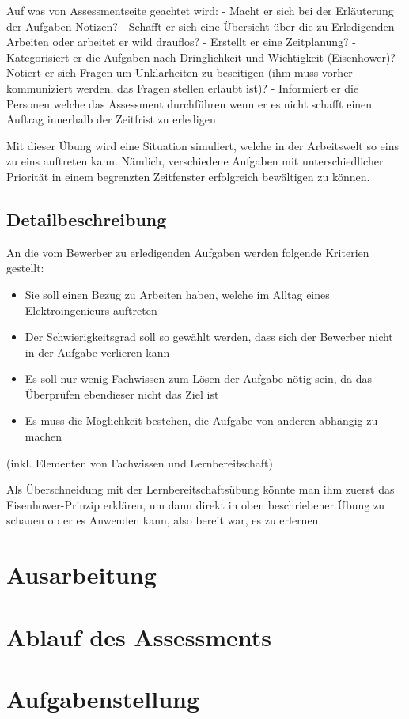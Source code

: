 Auf was von Assessmentseite geachtet wird:
- Macht er sich bei der Erläuterung der Aufgaben Notizen?
- Schafft er sich eine Übersicht über die zu Erledigenden Arbeiten oder arbeitet er wild drauflos?
- Erstellt er eine Zeitplanung?
- Kategorisiert er die Aufgaben nach Dringlichkeit und Wichtigkeit (Eisenhower)?
- Notiert er sich Fragen um Unklarheiten zu beseitigen (ihm muss vorher kommuniziert werden, das Fragen stellen erlaubt ist)?
- Informiert er die Personen welche das Assessment durchführen wenn er es nicht schafft einen Auftrag innerhalb der Zeitfrist zu erledigen

Mit dieser Übung wird eine Situation simuliert, welche in der Arbeitswelt so eins zu eins auftreten kann. Nämlich, verschiedene Aufgaben mit unterschiedlicher Priorität in einem begrenzten Zeitfenster erfolgreich bewältigen zu können.

\subsection{Detailbeschreibung}

An die vom Bewerber zu erledigenden Aufgaben werden folgende Kriterien gestellt:

\begin{itemize}
\item Sie soll einen Bezug zu Arbeiten haben, welche im Alltag eines Elektroingenieurs auftreten
\item Der Schwierigkeitsgrad soll so gewählt werden, dass sich der Bewerber nicht in der Aufgabe verlieren kann \item Es soll nur wenig Fachwissen zum Lösen der Aufgabe nötig sein, da das Überprüfen ebendieser nicht das Ziel ist
\item Es muss die Möglichkeit bestehen, die Aufgabe von anderen abhängig zu machen
\end{itemize}

(inkl. Elementen von Fachwissen und Lernbereitschaft)

Als Überschneidung mit der Lernbereitschaftsübung könnte man ihm zuerst das Eisenhower-Prinzip erklären, um dann direkt in oben beschriebener Übung zu schauen ob er es Anwenden kann, also bereit war, es zu erlernen. 

\section{Ausarbeitung}

\section{Ablauf des Assessments}

\section{Aufgabenstellung}
